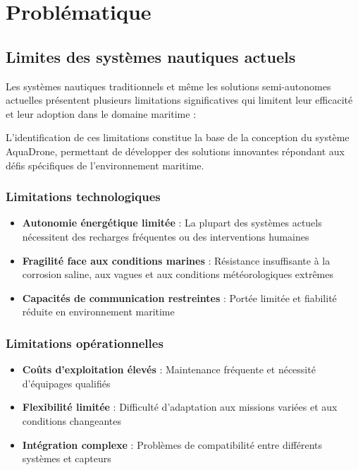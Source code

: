 \chapter[Problématique]{Problématique}
\label{cp:problematique}

{
\parindent0pt

\section{Limites des systèmes nautiques actuels}
Les systèmes nautiques traditionnels et même les solutions semi-autonomes actuelles présentent plusieurs limitations significatives qui limitent leur efficacité et leur adoption dans le domaine maritime :

\begin{block}[note]
L'identification de ces limitations constitue la base de la conception du système AquaDrone, permettant de développer des solutions innovantes répondant aux défis spécifiques de l'environnement maritime.
\end{block}

\subsection{Limitations technologiques}
\begin{itemize}
    \setlength{\itemsep}{.375em}
    \item \textbf{Autonomie énergétique limitée} : La plupart des systèmes actuels nécessitent des recharges fréquentes ou des interventions humaines
    \item \textbf{Fragilité face aux conditions marines} : Résistance insuffisante à la corrosion saline, aux vagues et aux conditions météorologiques extrêmes
    \item \textbf{Capacités de communication restreintes} : Portée limitée et fiabilité réduite en environnement maritime
\end{itemize}

\subsection{Limitations opérationnelles}
\begin{itemize}
    \setlength{\itemsep}{.375em}
    \item \textbf{Coûts d'exploitation élevés} : Maintenance fréquente et nécessité d'équipages qualifiés
    \item \textbf{Flexibilité limitée} : Difficulté d'adaptation aux missions variées et aux conditions changeantes
    \item \textbf{Intégration complexe} : Problèmes de compatibilité entre différents systèmes et capteurs
\end{itemize}

}
